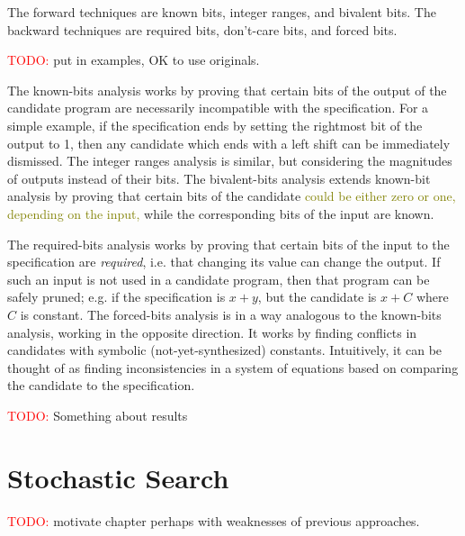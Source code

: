 \documentclass[12pt,twoside]{reedthesis}
\newcommand{\red}[1]{\textcolor{red}{#1}}
\newcommand{\green}[1]{\textcolor{olive}{#1}}
\newcommand{\addressed}[2]{{#1}}
\begin{document}
The forward techniques are 
    known bits,
    integer ranges, and
    bivalent bits.
The backward techniques are 
    required bits,
    don't-care bits, and
    forced bits.
    
\red{TODO:} put in examples, OK to use originals.
    
The known-bits analysis works by proving that certain bits of the output of the candidate program are necessarily incompatible with the specification.
For a simple example, if the specification ends by setting the rightmost bit of the output to 1, then any candidate which ends with a left shift can be immediately dismissed.
The integer ranges analysis is similar, but considering the magnitudes of outputs instead of their bits.
The bivalent-bits analysis extends known-bit analysis by proving that certain bits of the candidate \green{could be either zero or one, depending on the input,}
while the corresponding bits of the input are known.
    
The required-bits analysis works by proving that certain bits of the input to the specification are \textit{required}, i.e. that changing its value can change the output.
    If such an input is not used in a candidate program, then that program can be safely pruned;
        e.g. if the specification is $x + y$, but the candidate is $x + C$ where $C$ is constant.
The forced-bits analysis is in a way analogous to the known-bits analysis, working in the opposite direction.
    It works by finding conflicts in candidates with symbolic (not-yet-synthesized) constants.
    Intuitively, it can be thought of as finding inconsistencies in a system of equations based on comparing the candidate to the specification. %
    
\red{TODO:} Something about results
    

\chapter{Stochastic Search}
\red{TODO:} motivate chapter perhaps with weaknesses of previous approaches.
    
\end{document}
